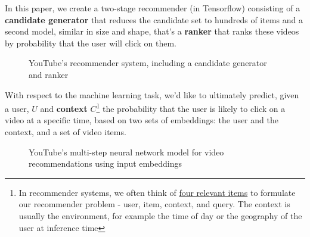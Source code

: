 \documentclass[11pt, table]{diazessay} %
\begin{document}
\begin{sloppypar}
In this paper, we create a two-stage recommender (in Tensorflow) consisting of a \textbf{candidate generator} that reduces the candidate set to hundreds of items and a second model, similar in size and shape, that's a \textbf{ranker} that ranks these videos by probability that the user will click on them.

\begin{figure}[H]
\caption{YouTube's recommender system, including a candidate generator and ranker\citep{covington2016deep}}
\end{figure}

With respect to the machine learning task, we'd like to ultimately predict, given a user, $U$ and \textbf{context} $C$\footnote{In recommender systems, we often think of \href{https://md.ekstrandom.net/blog/2015/10/search-and-recsys}{four relevant items} to formulate our recommender problem - user, item, context, and query. The context is usually the environment, for example the time of day or the geography of the user at inference time } the probability that the user is likely to click on a video at a specific time, based on two sets of embeddings: the user and the context, and a set of video items. 

\begin{figure}[H]
\caption{YouTube's multi-step neural network model for video recommendations using input embeddings\citep{covington2016deep}}
\end{figure}


\end{sloppypar}
\end{document}
